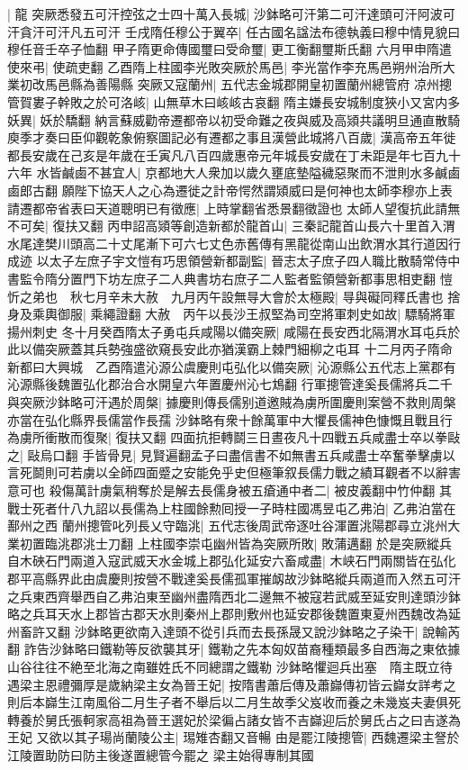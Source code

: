 |{
	龍}
突厥悉發五可汗控弦之士四十萬入長城|{
	沙鉢略可汗第二可汗達頭可汗阿波可汗貪汗可汗凡五可汗}
壬戌隋任穆公于翼卒|{
	任古國名諡法布德執義曰穆中情見貌曰穆任音壬卒子恤翻}
甲子隋更命傳國璽曰受命璽|{
	更工衡翻璽斯氏翻}
六月甲申隋遣使來弔|{
	使疏吏翻}
乙酉隋上柱國李光敗突厥於馬邑|{
	李光當作李充馬邑朔州治所大業初改馬邑縣為善陽縣}
突厥又寇蘭州|{
	五代志金城郡開皇初置蘭州總管府}
凉州摠管賀婁子幹敗之於可洛峐|{
	山無草木曰峐峐古哀翻}
隋主嫌長安城制度狹小又宮内多妖異|{
	妖於驕翻}
納言蘇威勸帝遷都帝以初受命難之夜與威及高熲共議明旦通直散騎庾季才奏曰臣仰觀乾象俯察圖記必有遷都之事且漢營此城將八百歲|{
	漢高帝五年徙都長安歲在己亥是年歲在壬寅凡八百四歲惠帝元年城長安歲在丁未距是年七百九十六年}
水皆鹹鹵不甚宜人|{
	京都地大人衆加以歲久壅底墊隘穢惡聚而不泄則水多鹹鹵鹵郎古翻}
願陛下協天人之心為遷徙之計帝愕然謂熲威曰是何神也太師李穆亦上表請遷都帝省表曰天道聰明已有徵應|{
	上時掌翻省悉景翻徵證也}
太師人望復抗此請無不可矣|{
	復扶又翻}
丙申詔高熲等創造新都於龍首山|{
	三秦記龍首山長六十里首入渭水尾達樊川頭高二十丈尾漸下可六七丈色赤舊傳有黑龍從南山出飲渭水其行道因行成迹}
以太子左庶子宇文愷有巧思領營新都副監|{
	晉志太子庶子四人職比散騎常侍中書監令隋分置門下坊左庶子二人典書坊右庶子二人監者監領營新都事思相吏翻}
愷忻之弟也　秋七月辛未大赦　九月丙午設無㝵大會於太極殿|{
	㝵與礙同釋氏書也}
捨身及乘輿御服|{
	乘繩證翻}
大赦　丙午以長沙王叔堅為司空將軍刺史如故|{
	驃騎將軍揚州刺史}
冬十月癸酉隋太子勇屯兵咸陽以備突厥|{
	咸陽在長安西北隔渭水耳屯兵於此以備突厥蓋其兵勢強盛欲窺長安此亦猶漢霸上棘門細柳之屯耳}
十二月丙子隋命新都曰大興城　乙酉隋遣沁源公虞慶則屯弘化以備突厥|{
	沁源縣公五代志上黨郡有沁源縣後魏置弘化郡治合水開皇六年置慶州沁七鴆翻}
行軍摠管達奚長儒將兵二千與突厥沙鉢略可汗遇於周槃|{
	據慶則傳長儒别道邀賊為虜所圍慶則案營不救則周槃亦當在弘化縣界長儒當作長孺}
沙鉢略有衆十餘萬軍中大懼長儒神色慷慨且戰且行為虜所衝散而復聚|{
	復扶又翻}
四面抗拒轉鬬三日晝夜凡十四戰五兵咸盡士卒以拳敺之|{
	敺烏口翻}
手皆骨見|{
	見賢遍翻孟子曰盡信書不如無書五兵咸盡士卒奮拳擊虜以言死鬬則可若虜以全師四面蹙之安能免乎史但極筆叙長儒力戰之績耳觀者不以辭害意可也}
殺傷萬計虜氣稍奪於是解去長儒身被五瘡通中者二|{
	被皮義翻中竹仲翻}
其戰士死者什八九詔以長儒為上柱國餘勲囘授一子時柱國馮昱屯乙弗泊|{
	乙弗泊當在鄯州之西}
蘭州摠管叱列長乂守臨洮|{
	五代志後周武帝逐吐谷渾置洮陽郡尋立洮州大業初置臨洮郡洮士刀翻}
上柱國李崇屯幽州皆為突厥所敗|{
	敗蒲邁翻}
於是突厥縱兵自木硤石門兩道入寇武威天水金城上郡弘化延安六畜咸盡|{
	木峡石門兩關皆在弘化郡平高縣界此由虞慶則按營不戰達奚長儒孤軍摧衂故沙鉢略縱兵兩道而入然五可汗之兵東西齊舉西自乙弗泊東至幽州盡隋西北二邊無不被寇若武威至延安則達頭沙鉢略之兵耳天水上郡皆古郡天水則秦州上郡則敷州也延安郡後魏置東夏州西魏改為延州畜許又翻}
沙鉢略更欲南入達頭不從引兵而去長孫晟又說沙鉢略之子染干|{
	說輸芮翻}
詐告沙鉢略曰鐵勒等反欲襲其牙|{
	鐵勒之先本匈奴苗裔種類最多自西海之東依據山谷往往不絶至北海之南雖姓氏不同總謂之鐵勒}
沙鉢略懼迴兵出塞　隋主既立待遇梁主恩禮彌厚是歲納梁主女為晉王妃|{
	按隋書蕭后傳及蕭巋傳初皆云巋女詳考之則后本巋生江南風俗二月生子者不舉后以二月生故季父岌收而養之未幾岌夫妻俱死轉養於舅氏張軻家高祖為晉王選妃於梁徧占諸女皆不吉巋迎后於舅氏占之曰吉遂為王妃}
又欲以其子瑒尚蘭陵公主|{
	㻛雉杏翻又音暢}
由是罷江陵摠管|{
	西魏遷梁主詧於江陵置助防曰防主後遂置總管今罷之}
梁主始得專制其國

